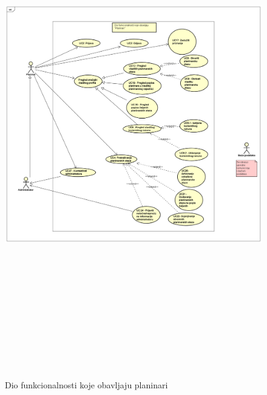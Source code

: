 			\begin{figure}[H]
				\includegraphics[scale=1, width = 165mm, height=220mm]{dijagrami/planinar1.png} %
				\centering
				\caption{Dio funkcionalnosti koje obavljaju planinari}
				\label{fig:UC dijagrami}
			\end{figure}
	
